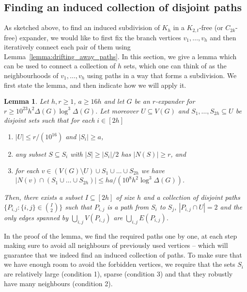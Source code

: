 \documentclass[10pt, a4paper]{article}
\numberwithin{theorem}{section} %
\newtheorem{lemma}[theorem]{Lemma}
\theoremstyle{remark}
\theoremstyle{definition}
\begin{document}
\subsection{Finding an induced collection of disjoint paths}

As sketched above, to find an induced subdivision of $K_h$ in a $K_{2,t}$-free (or $C_{2k}$-free) expander, we would like to first fix the branch vertices $v_1, \dots, v_h$ and then iteratively connect each pair of them using Lemma~\ref{lemma:drifting_away_paths}. In this section, we give a lemma which can be used to connect a collection of $h$ sets, which one can think of as the neighbourhoods of $v_1, \dots, v_h$ using paths in a way that forms a subdivision. We first state the lemma, and then indicate how we will apply it.

\begin{lemma}\label{lemma:collection_of_paths}
    Let $h, r \geq 1$, $a \geq 16h$ and let $G$ be an $r$-expander for $r \geq 10^{23}h^2\Delta(G)\log^3\Delta(G)$.
    Let moreover $U \subseteq V(G)$ and  $S_1, \dots, S_{2h} \subseteq U$ be disjoint sets such that for each $i \in [2h]$
    \begin{enumerate}
        \item $|U| \leq r/(10^{16})$ and $|S_i| \geq a$, 
        \item any subset $S \subseteq S_i$ with $|S| \geq |S_i| /2$ has $|N(S)| \geq r$, \emph{and}
        \item for each $v \in \left(V(G) \setminus U\right) \cup S_1 \cup \dots \cup S_{2h}$ we have $|N(v) \cap (S_1\cup \dots \cup S_{2h})| \leq ha/(10^{8}h^2\log^3\Delta(G))$.
    \end{enumerate}
    Then, there exists a subset $I \subseteq [2h]$ of size $h$ and a collection of disjoint paths $\{P_{i, j} : \{i, j\} \in \binom{I}{2}\}$ such that $P_{i, j}$ is a path from $S_i$ to $S_j$, $|P_{i, j} \cap U| =2$ and the only edges spanned by $\bigcup_{i, j} V(P_{i, j})$ are $\bigcup_{i, j} E(P_{i, j})$.
\end{lemma}

In the proof of the lemma, we find the required paths one by one, at each step making sure to avoid all neighbours of previously used vertices -- which will guarantee that we indeed find an induced collection of paths. To make sure that we have enough room to avoid the forbidden vertices, we require that the sets $S_i$ are relatively large (condition 1), sparse (condition 3) and that they robustly have many neighbours (condition 2).
\end{document}
